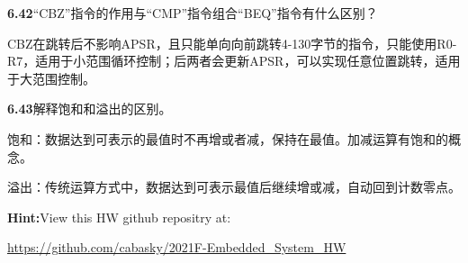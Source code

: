 \documentclass{article}
\begin{document}
    \noindent\textbf{6.42}“CBZ”指令的作用与“CMP”指令组合“BEQ”指令有什么区别？\par
    CBZ在跳转后不影响APSR，且只能单向向前跳转4-130字节的指令，只能使用R0-R7，适用于小范围循环控制；后两者会更新APSR，可以实现任意位置跳转，适用于大范围控制。
    \\[4pt]\par

    \noindent\textbf{6.43}解释饱和和溢出的区别。\par
    饱和：数据达到可表示的最值时不再增或者减，保持在最值。加减运算有饱和的概念。\par
    溢出：传统运算方式中，数据达到可表示最值后继续增或减，自动回到计数零点。
    \\[4pt]\par

    \noindent\textbf{Hint:}\quad View this HW github repositry at:\par
    \quad \url{https://github.com/cabasky/2021F-Embedded_System_HW}
    \\[4pt]\par
\end{document}
